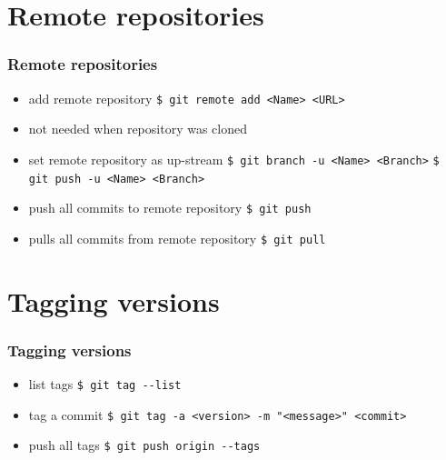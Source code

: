 \documentclass{beamer}
\begin{document}
	\section{Remote repositories}
	\begin{frame}
		\frametitle{Remote repositories}\pause
		\begin{itemize}
			\item add remote repository\newline
			\lstinline|$ git remote add <Name> <URL>| \pause
			\item not needed when repository was cloned \pause
			\item set remote repository as up-stream\newline
			\lstinline|$ git branch -u <Name> <Branch>|\newline
			\lstinline|$ git push -u <Name> <Branch>| \pause
			\item push all commits to remote repository\newline
			\lstinline|$ git push| \pause
			\item pulls all commits from remote repository\newline
			\lstinline|$ git pull| 
		\end{itemize}
	\end{frame}

	\section{Tagging versions}
	\begin{frame}
		\frametitle{Tagging versions}\pause
		\begin{itemize}
			\item list tags\newline
			\lstinline|$ git tag --list| \pause
			\item tag a commit\newline
			\lstinline|$ git tag -a <version> -m "<message>" <commit>| \pause
			\item push all tags\newline
			\lstinline|$ git push origin --tags|
		\end{itemize}
	\end{frame}
	
\end{document}
